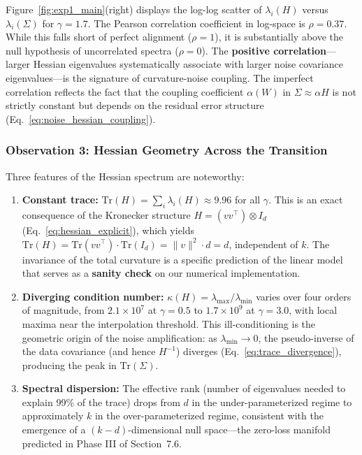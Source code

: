 \documentclass[
  journal=largetwo,
  year=2025,
  volume=37,
]{cup-journal}
\begin{document}
Figure~\ref{fig:exp1_main}(right) displays the log-log scatter of $\lambda_i(H)$ versus $\lambda_i(\Sigma)$ for $\gamma = 1.7$. The Pearson correlation coefficient in log-space is $\rho = 0.37$. While this falls short of perfect alignment ($\rho = 1$), it is substantially above the null hypothesis of uncorrelated spectra ($\rho = 0$). The \textbf{positive correlation}---larger Hessian eigenvalues systematically associate with larger noise covariance eigenvalues---is the signature of curvature-noise coupling. The imperfect correlation reflects the fact that the coupling coefficient $\alpha(W)$ in $\Sigma \approx \alpha H$ is not strictly constant but depends on the residual error structure (Eq.~\ref{eq:noise_hessian_coupling}).

\subsubsection{Observation 3: Hessian Geometry Across the Transition}

Three features of the Hessian spectrum are noteworthy:
\begin{enumerate}
    \item \textbf{Constant trace:} $\mathrm{Tr}(H) = \sum_i \lambda_i(H) \approx 9.96$ for all $\gamma$. This is an exact consequence of the Kronecker structure $H = (vv^\top) \otimes I_d$ (Eq.~\ref{eq:hessian_explicit}), which yields $\mathrm{Tr}(H) = \mathrm{Tr}(vv^\top) \cdot \mathrm{Tr}(I_d) = \|v\|^2 \cdot d = d$, independent of $k$. The invariance of the total curvature is a specific prediction of the linear model that serves as a \textbf{sanity check} on our numerical implementation.
    \item \textbf{Diverging condition number:} $\kappa(H) = \lambda_{\max}/\lambda_{\min}$ varies over four orders of magnitude, from $2.1 \times 10^7$ at $\gamma = 0.5$ to $1.7 \times 10^9$ at $\gamma = 3.0$, with local maxima near the interpolation threshold. This ill-conditioning is the geometric origin of the noise amplification: as $\lambda_{\min} \to 0$, the pseudo-inverse of the data covariance (and hence $H^{-1}$) diverges (Eq.~\ref{eq:trace_divergence}), producing the peak in $\mathrm{Tr}(\Sigma)$.
    \item \textbf{Spectral dispersion:} The effective rank (number of eigenvalues needed to explain 99\% of the trace) drops from $d$ in the under-parameterized regime to approximately $k$ in the over-parameterized regime, consistent with the emergence of a $(k-d)$-dimensional null space---the zero-loss manifold predicted in Phase III of Section~7.6.
\end{enumerate}
\end{document}
